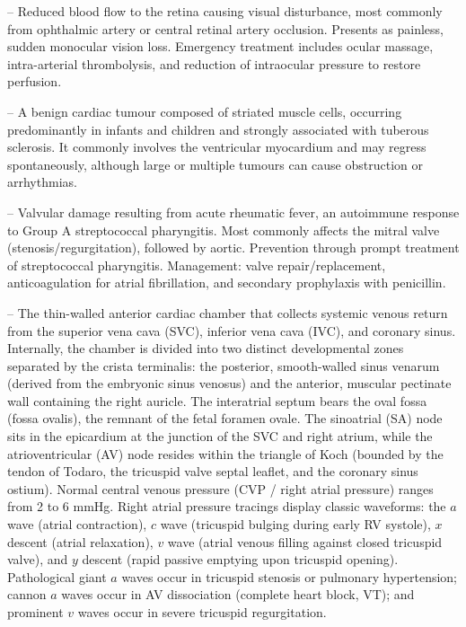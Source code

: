 -- Reduced blood flow to the retina causing visual disturbance, most commonly from ophthalmic artery or central retinal artery occlusion. Presents as painless, sudden monocular vision loss. Emergency treatment includes ocular massage, intra-arterial thrombolysis, and reduction of intraocular pressure to restore perfusion.

-- A benign cardiac tumour composed of striated muscle cells, occurring predominantly in infants and children and strongly associated with tuberous sclerosis. It commonly involves the ventricular myocardium and may regress spontaneously, although large or multiple tumours can cause obstruction or arrhythmias.

-- Valvular damage resulting from acute rheumatic fever, an autoimmune response to Group A streptococcal pharyngitis. Most commonly affects the mitral valve (stenosis/regurgitation), followed by aortic. Prevention through prompt treatment of streptococcal pharyngitis. Management: valve repair/replacement, anticoagulation for atrial fibrillation, and secondary prophylaxis with penicillin.

-- The thin-walled anterior cardiac chamber that collects systemic venous return from the superior vena cava (SVC), inferior vena cava (IVC), and coronary sinus. Internally, the chamber is divided into two distinct developmental zones separated by the crista terminalis: the posterior, smooth-walled sinus venarum (derived from the embryonic sinus venosus) and the anterior, muscular pectinate wall containing the right auricle. The interatrial septum bears the oval fossa (fossa ovalis), the remnant of the fetal foramen ovale. The sinoatrial (SA) node sits in the epicardium at the junction of the SVC and right atrium, while the atrioventricular (AV) node resides within the triangle of Koch (bounded by the tendon of Todaro, the tricuspid valve septal leaflet, and the coronary sinus ostium). Normal central venous pressure (CVP / right atrial pressure) ranges from 2 to 6 mmHg. Right atrial pressure tracings display classic waveforms: the $a$ wave (atrial contraction), $c$ wave (tricuspid bulging during early RV systole), $x$ descent (atrial relaxation), $v$ wave (atrial venous filling against closed tricuspid valve), and $y$ descent (rapid passive emptying upon tricuspid opening). Pathological giant $a$ waves occur in tricuspid stenosis or pulmonary hypertension; cannon $a$ waves occur in AV dissociation (complete heart block, VT); and prominent $v$ waves occur in severe tricuspid regurgitation.

